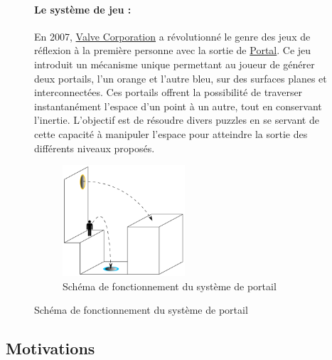 \documentclass[12pt]{report}
\begin{document}






\begin{figure}[H]
	\paragraph{Le système de jeu : }
	En 2007, \href{https://fr.wikipedia.org/wiki/Valve_Corporation}{Valve Corporation} a révolutionné le genre des jeux 
	de réflexion à la première personne avec la sortie de 
	\href{https://fr.wikipedia.org/wiki/Portal_(jeu_vid%C3%A9o)}{Portal}. Ce jeu introduit un mécanisme unique 
	permettant au joueur de générer deux portails, l'un orange et l'autre bleu, sur des surfaces planes et 
	interconnectées. Ces portails offrent la possibilité de traverser instantanément l'espace d'un point à un autre, 
	tout en conservant l'inertie. L'objectif est de résoudre divers puzzles en se servant de cette capacité à manipuler 
	l'espace pour atteindre la sortie des différents niveaux proposés.
	\begin{figure}[H]
		\centering
		\includegraphics[width=0.5\textwidth]{image/schema_portal.png}
		\hspace*{-0.5cm}
		\caption{Schéma de fonctionnement du système de portail}
		\label{fig:schema_portal}
	\end{figure}
\end{figure}

\subsection{Motivations}

\paragraph{}
\end{document}

